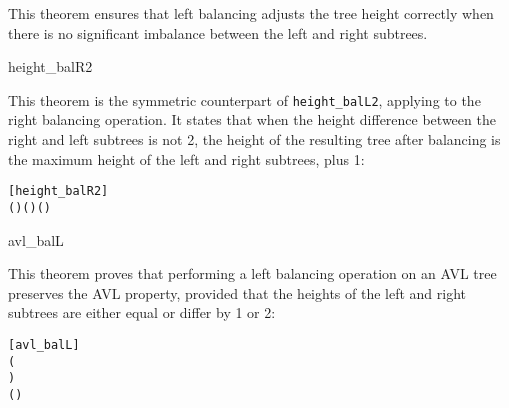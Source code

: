 This theorem ensures that left balancing adjusts the tree height correctly when there is no significant imbalance between the left and right subtrees.


\begin{thm}{height\_balR2}

This theorem is the symmetric counterpart of \texttt{height\_balL2}, applying to the right balancing operation. It states that when the height difference between the right and left subtrees is not 2, the height of the resulting tree after balancing is the maximum height of the left and right subtrees, plus 1:


\begin{alltt}
	[height_balR2]
	\HOLTokenTurnstile{}   \HOLSymConst{\HOLTokenConj{}}   \HOLSymConst{\HOLTokenConj{}}   \HOLSymConst{\HOLTokenNotEqual{}}   \HOLSymConst{\ensuremath{+}}  \HOLSymConst{\HOLTokenImp{}}
    (    ) \HOLSymConst{=}  \HOLSymConst{\ensuremath{+}}  ( ) ( )
\end{alltt}


\end{thm}

\begin{thm}{avl\_balL}

This theorem proves that performing a left balancing operation on an AVL tree preserves the AVL property, provided that the heights of the left and right subtrees are either equal or differ by 1 or 2:


\begin{alltt}
	[avl_balL]
	\HOLTokenTurnstile{}   \HOLSymConst{\HOLTokenConj{}}   \HOLSymConst{\HOLTokenConj{}}
   (  \HOLSymConst{=}   \HOLSymConst{\HOLTokenDisj{}}   \HOLSymConst{=}   \HOLSymConst{\ensuremath{+}}  \HOLSymConst{\HOLTokenDisj{}}
      \HOLSymConst{=}   \HOLSymConst{\ensuremath{+}}  \HOLSymConst{\HOLTokenDisj{}}   \HOLSymConst{=}   \HOLSymConst{\ensuremath{+}} ) \HOLSymConst{\HOLTokenImp{}}
    (    )
\end{alltt}


\end{thm}

